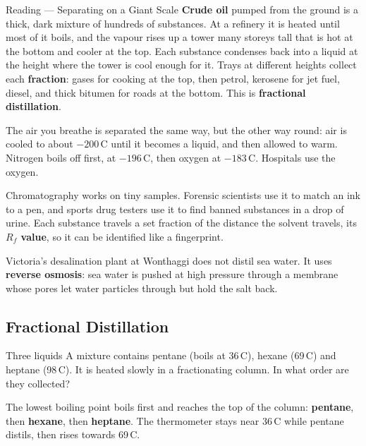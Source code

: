 \label{read:5}

\begin{readingbox}{Reading --- Separating on a Giant Scale}
\textbf{Crude oil} pumped from the ground is a thick, dark mixture of hundreds of substances. At a refinery it is heated until most of it boils, and the vapour rises up a tower many storeys tall that is hot at the bottom and cooler at the top. Each substance condenses back into a liquid at the height where the tower is cool enough for it. Trays at different heights collect each \textbf{fraction}: gases for cooking at the top, then petrol, kerosene for jet fuel, diesel, and thick bitumen for roads at the bottom. This is \textbf{fractional distillation}.

The air you breathe is separated the same way, but the other way round: air is cooled to about $-200$\,\textdegree C until it becomes a liquid, and then allowed to warm. Nitrogen boils off first, at $-196$\,\textdegree C, then oxygen at $-183$\,\textdegree C. Hospitals use the oxygen.

Chromatography works on tiny samples. Forensic scientists use it to match an ink to a pen, and sports drug testers use it to find banned substances in a drop of urine. Each substance travels a set fraction of the distance the solvent travels, its \textbf{$R_f$ value}, so it can be identified like a fingerprint.

Victoria's desalination plant at Wonthaggi does not distil sea water. It uses \textbf{reverse osmosis}: sea water is pushed at high pressure through a membrane whose pores let water particles through but hold the salt back.
\end{readingbox}

\rcreset
{}

\label{theory:5}

\subsection{Fractional Distillation}\label{sub:a5.1}

\begin{workedex}{Three liquids}
A mixture contains pentane (boils at 36\,\textdegree C), hexane (69\,\textdegree C) and heptane (98\,\textdegree C). It is heated slowly in a fractionating column. In what order are they collected?

\smallskip
The lowest boiling point boils first and reaches the top of the column: \textbf{pentane}, then \textbf{hexane}, then \textbf{heptane}. The thermometer stays near 36\,\textdegree C while pentane distils, then rises towards 69\,\textdegree C.
\end{workedex}

